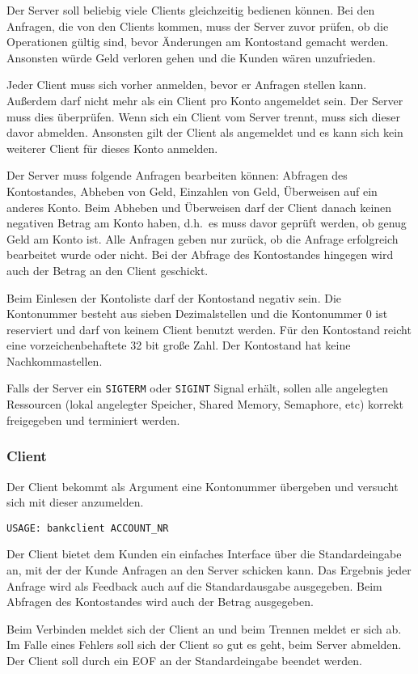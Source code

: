 Der Server soll beliebig viele Clients gleichzeitig bedienen können. Bei den
Anfragen, die von den Clients kommen, muss der Server zuvor prüfen, ob die
Operationen gültig sind, bevor Änderungen am Kontostand gemacht werden.
Ansonsten würde Geld verloren gehen und die Kunden wären unzufrieden.

Jeder Client muss sich vorher anmelden, bevor er Anfragen stellen kann.
Außerdem darf nicht mehr als ein Client pro Konto angemeldet sein. Der Server
muss dies überprüfen. Wenn sich ein Client vom Server trennt, muss sich dieser
davor abmelden. Ansonsten gilt der Client als angemeldet und es kann sich kein
weiterer Client für dieses Konto anmelden.

Der Server muss folgende Anfragen bearbeiten können: Abfragen des Kontostandes,
Abheben von Geld, Einzahlen von Geld, Überweisen auf ein anderes Konto. Beim
Abheben und Überweisen darf der Client danach keinen negativen Betrag am Konto
haben, d.h.\ es muss davor geprüft werden, ob genug Geld am Konto ist. Alle
Anfragen geben nur zurück, ob die Anfrage erfolgreich bearbeitet wurde oder
nicht. Bei der Abfrage des Kontostandes hingegen wird auch der Betrag an den
Client geschickt.

Beim Einlesen der Kontoliste darf der Kontostand negativ sein. Die Kontonummer
besteht aus sieben Dezimalstellen und die Kontonummer 0 ist reserviert und darf
von keinem Client benutzt werden. Für den Kontostand reicht eine
vorzeichenbehaftete 32 bit große Zahl.
Der Kontostand hat keine Nachkommastellen.

Falls der Server ein \verb|SIGTERM| oder \verb|SIGINT| Signal erhält, sollen
alle angelegten Ressourcen (lokal angelegter Speicher, Shared Memory,
Semaphore, etc) korrekt freigegeben und terminiert werden.


\subsubsection*{Client}

Der Client bekommt als Argument eine Kontonummer übergeben und versucht sich
mit dieser anzumelden.

\begin{verbatim}
USAGE: bankclient ACCOUNT_NR
\end{verbatim}

Der Client bietet dem Kunden ein einfaches Interface über die Standardeingabe
an, mit der der Kunde Anfragen an den Server schicken kann. Das Ergebnis jeder
Anfrage wird als Feedback auch auf die Standardausgabe ausgegeben.  Beim
Abfragen des Kontostandes wird auch der Betrag ausgegeben.

Beim Verbinden meldet sich der Client an und beim Trennen meldet er sich ab. Im
Falle eines Fehlers soll sich der Client so gut es geht, beim Server abmelden.
Der Client soll durch ein EOF an der Standardeingabe beendet werden.


\osueguidelinesthree



